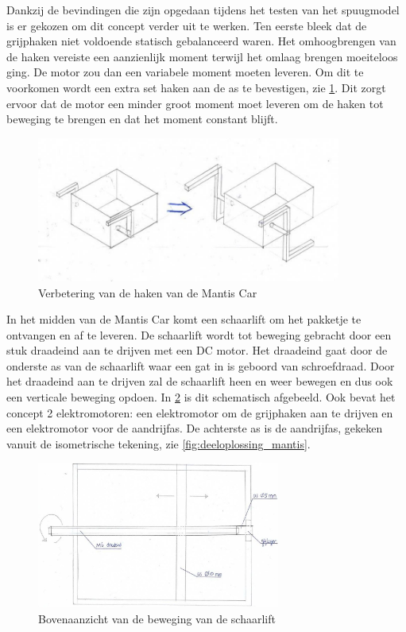 Dankzij de bevindingen die zijn opgedaan tijdens het testen van het spuugmodel is er gekozen om dit concept verder uit te werken. Ten eerste bleek dat de grijphaken niet voldoende statisch gebalanceerd waren. Het omhoogbrengen van de haken vereiste een aanzienlijk moment terwijl het omlaag brengen moeiteloos ging. De motor zou dan een variabele moment moeten leveren. Om dit te voorkomen wordt een extra set haken aan de as te bevestigen, zie \cref{fig:Mantis_haak}. Dit zorgt ervoor dat de motor een minder groot moment moet leveren om de haken tot beweging te brengen en dat het moment constant blijft.
\begin{figure}[H]
    \includegraphics[width = 100mm]{04_idee_ontwikkeling/Mantiscar_armen.jpeg}
    \caption{Verbetering van de haken van de Mantis Car}
    \label{fig:Mantis_haak}
\end{figure}

\vspace{\baselineskip}
In het midden van de Mantis Car komt een schaarlift om het pakketje te ontvangen en af te leveren. De schaarlift wordt tot beweging gebracht door een stuk draadeind aan te drijven met een DC motor. Het draadeind gaat door de onderste as van de schaarlift waar een gat in is geboord van schroefdraad. Door het draadeind aan te drijven zal de schaarlift heen en weer bewegen en dus ook een verticale beweging opdoen. In \cref{fig:Schaar_boven} is dit schematisch afgebeeld.  Ook bevat het concept 2 elektromotoren: een elektromotor om de grijphaken aan te drijven en een elektromotor voor de aandrijfas. De achterste as is de aandrijfas, gekeken vanuit de isometrische tekening, zie \cref{fig:deeloplossing_mantis}. \\
\vspace{\baselineskip}

\begin{figure}[H]
    \centering
    \includegraphics[width = 80mm]{04_idee_ontwikkeling/Bovenaanzicht_schaarlift.jpeg}
    \caption{Bovenaanzicht van de beweging van de schaarlift}
    \label{fig:Schaar_boven}
\end{figure}



